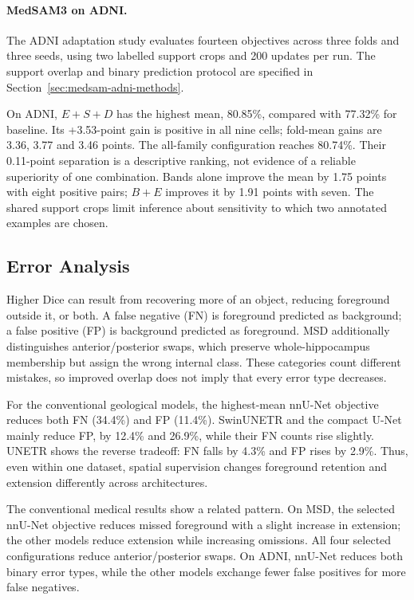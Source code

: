 \documentclass[12pt,a4paper]{article}
\begin{document}
\FloatBarrier
\paragraph{MedSAM3 on ADNI.}
\label{sec:medsam-adni-results}

The ADNI adaptation study evaluates fourteen objectives across three
folds and three seeds, using two labelled support crops and 200 updates
per run. The support overlap and binary prediction protocol are
specified in Section~\ref{sec:medsam-adni-methods}.


On ADNI, $E+S+D$ has the highest mean, 80.85\%, compared with 77.32\%
for baseline. Its +3.53-point gain is positive in all nine cells;
fold-mean gains are 3.36, 3.77 and 3.46 points. The all-family
configuration reaches 80.74\%. Their 0.11-point separation is a
descriptive ranking, not evidence of a reliable superiority of one
combination. Bands alone improve the mean by 1.75 points with eight
positive pairs; $B+E$ improves it by 1.91 points with seven. The
shared support crops limit inference about sensitivity to which two
annotated examples are chosen.

\FloatBarrier
\subsection{Error Analysis}
\label{sec:error-analysis}
\label{sec:capped-errors-resources}

Higher Dice can result from recovering more of an object, reducing
foreground outside it, or both. A false negative (FN) is foreground
predicted as background; a false positive (FP) is background predicted as
foreground. MSD additionally distinguishes anterior/posterior swaps,
which preserve whole-hippocampus membership but assign the wrong internal
class. These categories count different mistakes, so improved overlap
does not imply that every error type decreases.

For the conventional geological models, the highest-mean nnU-Net objective
reduces both FN (34.4\%) and FP (11.4\%). SwinUNETR and the compact U-Net
mainly reduce FP, by 12.4\% and 26.9\%, while their FN counts rise
slightly. UNETR shows the reverse tradeoff: FN falls by 4.3\% and FP
rises by 2.9\%. Thus, even within one dataset, spatial supervision changes
foreground retention and extension differently across architectures.

The conventional medical results show a related pattern. On MSD, the
selected nnU-Net objective reduces missed foreground with a slight
increase in extension; the other models reduce extension while increasing
omissions. All four selected configurations reduce anterior/posterior
swaps. On ADNI, nnU-Net reduces both binary error types, while the other
models exchange fewer false positives for more false negatives.
\end{document}
